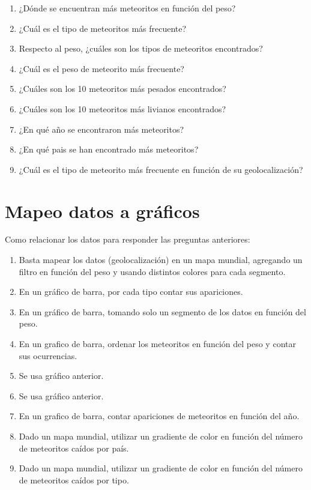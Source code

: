 \documentclass[letterpaper,10pt]{article}
\begin{document}
	\begin{enumerate}
		\item ¿Dónde se encuentran más meteoritos en función del peso?
		\item ¿Cuál es el tipo de meteoritos más frecuente? %
		\item Respecto al peso, ¿cuáles son los tipos de meteoritos encontrados? %

		\item ¿Cuál es el peso de meteorito más frecuente?
		\item ¿Cuáles son los 10 meteoritos más pesados encontrados?
		\item ¿Cuáles son los 10 meteoritos más livianos encontrados?

		\item ¿En qué año se encontraron más meteoritos?
		\item ¿En qué pais se han encontrado más meteoritos?
		\item ¿Cuál es el tipo de meteorito más frecuente en función de su geolocalización?
	\end{enumerate}

	\section{Mapeo datos a gráficos}

	Como relacionar los datos para responder las preguntas anteriores:

	\begin{enumerate}
		\item Basta mapear los datos (geolocalización) en un mapa mundial, agregando un filtro en función del peso y usando distintos colores para cada segmento.
		\item En un gráfico de barra, por cada tipo contar sus apariciones.
		\item En un gráfico de barra, tomando solo un segmento de los datos en función del peso.

		\item En un grafico de barra, ordenar los meteoritos en función del peso y contar sus ocurrencias.
		\item Se usa gráfico anterior.
		\item Se usa gráfico anterior.

		\item En un grafico de barra, contar apariciones de meteoritos en función del año.
		\item Dado un mapa mundial, utilizar un gradiente de color en función del número de meteoritos caídos por país.
		\item Dado un mapa mundial, utilizar un gradiente de color en función del número de meteoritos caídos por tipo.
	\end{enumerate}
\end{document}

